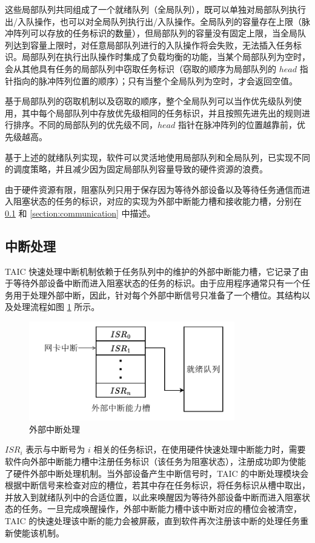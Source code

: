 这些局部队列共同组成了一个就绪队列（全局队列），既可以单独对局部队列执行出/入队操作，也可以对全局队列执行出/入队操作。全局队列的容量存在上限（脉冲阵列可以存放的任务标识的数量），但局部队列的容量没有固定上限，当全局队列达到容量上限时，对任意局部队列进行的入队操作将会失败，无法插入任务标识。局部队列在执行出队操作时集成了负载均衡的功能，当某个局部队列为空时，会从其他具有任务的局部队列中窃取任务标识（窃取的顺序为局部队列的 $head$ 指针指向的脉冲阵列位置的顺序）；只有当整个全局队列为空时，才会返回空值。

基于局部队列的窃取机制以及窃取的顺序，整个全局队列可以当作优先级队列使用，其中每个局部队列中存放优先级相同的任务标识，并且按照先进先出的规则进行排序。不同的局部队列的优先级不同，$head$ 指针在脉冲阵列的位置越靠前，优先级越高。

基于上述的就绪队列实现，软件可以灵活地使用局部队列和全局队列，已实现不同的调度策略，并且减少因为固定局部队列容量导致的硬件资源的浪费。

由于硬件资源有限，阻塞队列只用于保存因为等待外部设备以及等待任务通信而进入阻塞状态的任务的标识，对应的实现为外部中断能力槽和接收能力槽，分别在 \ref{section:interrupt} 和 \ref{section:communication} 中描述。

\subsection{中断处理}
\label{section:interrupt}

TAIC 快速处理中断机制依赖于任务队列中的维护的外部中断能力槽，它记录了由于等待外部设备中断而进入阻塞状态的任务的标识。由于应用程序通常只有一个任务用于处理外部中断，因此，针对每个外部中断信号只准备了一个槽位。其结构以及处理流程如图 \ref{figure:extintr} 所示。

\begin{figure}[htbp]
  \centering
  \includegraphics[width=0.8\textwidth]{figures/pdfs/extintr.pdf}
  \caption{外部中断处理}
  \label{figure:extintr}
\end{figure}

$ISR_{i}$ 表示与中断号为 $i$ 相关的任务标识，在使用硬件快速处理中断能力时，需要软件向外部中断能力槽中注册任务标识（该任务为阻塞状态），注册成功即为使能了硬件外部中断处理机制。当外部设备产生中断信号时，TAIC 的中断处理模块会根据中断信号来检查对应的槽位，若其中存在任务标识，将任务标识从槽中取出，并放入到就绪队列中的合适位置，以此来唤醒因为等待外部设备中断而进入阻塞状态的任务。一旦完成唤醒操作，外部中断能力槽中该中断对应的槽位会被清空，TAIC 的快速处理该中断的能力会被屏蔽，直到软件再次注册该中断的处理任务重新使能该机制。

